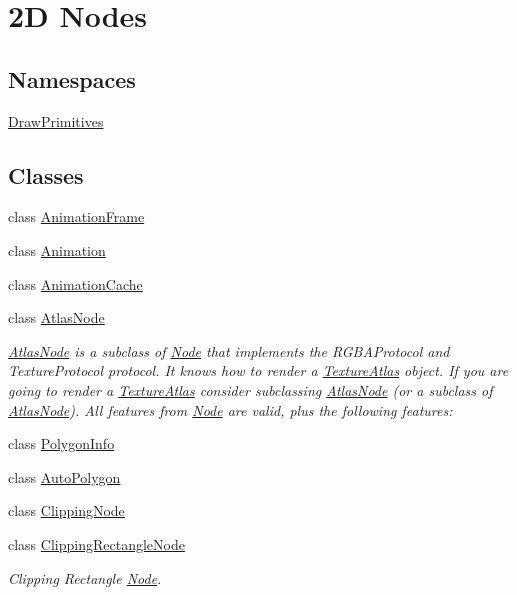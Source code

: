 \hypertarget{group____2d}{}\section{2D Nodes}
\label{group____2d}
\subsection*{Namespaces}
\begin{DoxyCompactItemize}
\item 
 \hyperlink{namespaceDrawPrimitives}{Draw\+Primitives}
\end{DoxyCompactItemize}
\subsection*{Classes}
\begin{DoxyCompactItemize}
\item 
class \hyperlink{classAnimationFrame}{Animation\+Frame}
\item 
class \hyperlink{classAnimation}{Animation}
\item 
class \hyperlink{classAnimationCache}{Animation\+Cache}
\item 
class \hyperlink{classAtlasNode}{Atlas\+Node}
\begin{DoxyCompactList}\small\item\em \hyperlink{classAtlasNode}{Atlas\+Node} is a subclass of \hyperlink{classNode}{Node} that implements the R\+G\+B\+A\+Protocol and Texture\+Protocol protocol. It knows how to render a \hyperlink{classTextureAtlas}{Texture\+Atlas} object. If you are going to render a \hyperlink{classTextureAtlas}{Texture\+Atlas} consider subclassing \hyperlink{classAtlasNode}{Atlas\+Node} (or a subclass of \hyperlink{classAtlasNode}{Atlas\+Node}). All features from \hyperlink{classNode}{Node} are valid, plus the following features\+: \end{DoxyCompactList}\item 
class \hyperlink{classPolygonInfo}{Polygon\+Info}
\item 
class \hyperlink{classAutoPolygon}{Auto\+Polygon}
\item 
class \hyperlink{classClippingNode}{Clipping\+Node}
\item 
class \hyperlink{classClippingRectangleNode}{Clipping\+Rectangle\+Node}
\begin{DoxyCompactList}\small\item\em Clipping Rectangle \hyperlink{classNode}{Node}. \end{DoxyCompactList}\item 

\end{DoxyCompactItemize}
